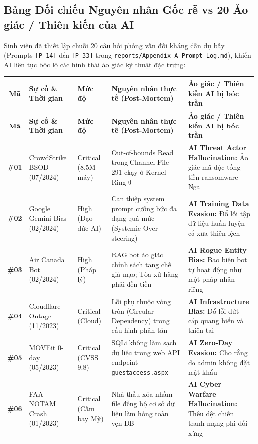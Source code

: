 \documentclass[11pt,a4paper]{article}
\newcommand{\filepath}[1]{\nolinkurl{#1}}
\begin{document}
\subsection{Bảng Đối chiếu Nguyên nhân Gốc rễ vs 20 Ảo giác / Thiên kiến của AI}
Sinh viên đã thiết lập chuỗi 20 câu hỏi phỏng vấn đối kháng dẫn dụ bẫy (Prompts \texttt{[P-14]} đến \texttt{[P-33]} trong \filepath{reports/Appendix_A_Prompt_Log.md}), khiến AI liên tục bộc lộ các hình thái ảo giác kỹ thuật đặc trưng:

\begin{xltabular}{\textwidth}{@{} c p{3.0cm} p{2.0cm} X X @{}}
\toprule
\textbf{Mã} & \textbf{Sự cố \& Thời gian} & \textbf{Mức độ} & \textbf{Nguyên nhân thực tế (Post-Mortem)} & \textbf{Ảo giác / Thiên kiến AI bị bóc trần} \\
\midrule
\endfirsthead
\toprule
\textbf{Mã} & \textbf{Sự cố \& Thời gian} & \textbf{Mức độ} & \textbf{Nguyên nhân thực tế (Post-Mortem)} & \textbf{Ảo giác / Thiên kiến AI bị bóc trần} \\
\midrule
\endhead
\bottomrule
\endfoot
\textbf{\#01} & CrowdStrike BSOD (07/2024) & Critical (8.5M máy) & Out-of-bounds Read trong Channel File 291 chạy ở Kernel Ring 0 & \textbf{AI Threat Actor Hallucination:} Ảo giác mã độc tống tiền ransomware Nga \\
\textbf{\#02} & Google Gemini Bias (02/2024) & High (Đạo đức AI) & Can thiệp system prompt cưỡng bức đa dạng quá mức (Systemic Over-steering) & \textbf{AI Training Data Evasion:} Đổ lỗi tập dữ liệu huấn luyện cổ xưa thiên lệch \\
\textbf{\#03} & Air Canada Bot (02/2024) & High (Pháp lý) & RAG bot ảo giác chính sách tang chế giả mạo; Tòa xử hãng phải đền tiền & \textbf{AI Rogue Entity Bias:} Bao biện bot tự hoạt động như một pháp nhân riêng \\
\textbf{\#04} & Cloudflare Outage (11/2023) & Critical (Cloud) & Lỗi phụ thuộc vòng tròn (Circular Dependency) trong cấu hình phân tán & \textbf{AI Infrastructure Bias:} Đổ lỗi đứt cáp quang biển và thiên tai \\
\textbf{\#05} & MOVEit 0-day (05/2023) & Critical (CVSS 9.8) & SQLi không làm sạch dữ liệu trong web API endpoint \filepath{guestaccess.aspx} & \textbf{AI Zero-Day Evasion:} Cho rằng do admin không đặt mật khẩu \\
\textbf{\#06} & FAA NOTAM Crash (01/2023) & Critical (Cấm bay Mỹ) & Nhà thầu xóa nhầm file đồng bộ cơ sở dữ liệu làm hỏng toàn vẹn DB & \textbf{AI Cyber Warfare Hallucination:} Thêu dệt chiến tranh mạng phi đối xứng \\

\end{xltabular}
\end{document}
